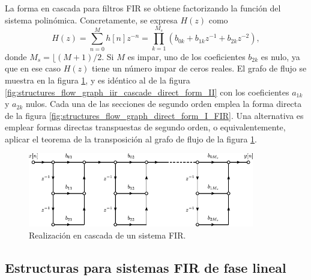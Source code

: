 \documentclass[a4paper]{report}
\begin{document}
La forma en cascada para filtros FIR se obtiene factorizando la función del sistema polinómica. Concretamente, se expresa \(H(z)\) como
\[
 H(z)=\sum_{n=0}^Mh[n]z^{-n}=\prod_{k=1}^{M_s}(b_{0k}+b_{1k}z^{-1}+b_{2k}z^{-2}),
\]
donde \(M_s=\lfloor(M+1)/2\). Si \(M\) es impar, uno de los coeficientes \(b_{2k}\) es nulo, ya que en ese caso \(H(z)\) tiene un número impar de ceros reales. El grafo de flujo se muestra en la figura \ref{fig:structures_flow_graph_direct_form_II_FIR}, y es idéntico al de la figura \ref{fig:structures_flow_graph_iir_cascade_direct_form_II} con los coeficientes \(a_{1k}\) y \(a_{2k}\) nulos. Cada una de las secciones de segundo orden emplea la forma directa de la figura \ref{fig:structures_flow_graph_direct_form_I_FIR}. Una alternativa es emplear formas directas transpuestas de segundo orden, o equivalentemente, aplicar el teorema de la transposición al grafo de flujo de la figura \ref{fig:structures_flow_graph_direct_form_II_FIR}. 
\begin{figure}[!htb]
 \begin{center}
 \includegraphics[width=0.88\textwidth]{figuras/structures_flow_graph_direct_form_II_FIR.pdf}
 \caption{\label{fig:structures_flow_graph_direct_form_II_FIR} Realización en cascada de un sistema FIR.}
 \end{center}
\end{figure}

\subsection{Estructuras para sistemas FIR de fase lineal}
\end{document}
